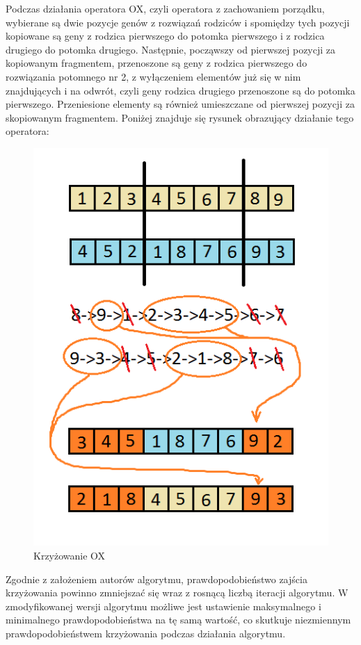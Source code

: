 Podczas działania operatora OX, czyli operatora z zachowaniem porządku, wybierane są dwie pozycje genów z rozwiązań rodziców i spomiędzy tych pozycji kopiowane są geny z rodzica pierwszego do potomka pierwszego i z rodzica drugiego do potomka drugiego. Następnie, począwszy od pierwszej pozycji za kopiowanym fragmentem, przenoszone są geny z rodzica pierwszego do rozwiązania potomnego nr 2, z wyłączeniem elementów już się w nim znajdujących i na odwrót, czyli geny rodzica drugiego przenoszone są do potomka pierwszego. Przeniesione elementy są również umieszczane od pierwszej pozycji za skopiowanym fragmentem. Poniżej znajduje się rysunek obrazujący działanie tego operatora:

\newpage
\begin{figure}[h]
\begin{center}
\includegraphics[scale=0.7]{ox}
\caption{Krzyżowanie OX}
\end{center}
\end{figure}

Zgodnie z założeniem autorów algorytmu, prawdopodobieństwo zajścia krzyżowania powinno zmniejszać się wraz z rosnącą liczbą iteracji algorytmu. W zmodyfikowanej wersji algorytmu możliwe jest ustawienie maksymalnego i minimalnego prawdopodobieństwa na tę samą wartość, co skutkuje niezmiennym prawdopodobieństwem krzyżowania podczas działania algorytmu.

